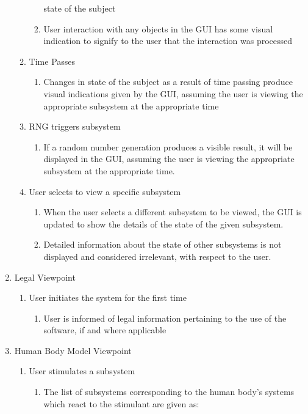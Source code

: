 \documentclass[]{article}
\begin{document}
\begin{enumerate}
\begin{enumerate}
\begin{enumerate}
			state of the subject
			\item User interaction with any objects in the GUI has some visual indication to signify to the user that the interaction was processed
		\end{enumerate}
		\item Time Passes
		\begin{enumerate}
		    \item Changes in state of the subject as a result of time passing produce visual indications given by the GUI, assuming the user is viewing the
		    appropriate subsystem at the appropriate time
		\end{enumerate}
		\item RNG triggers subsystem
		\begin{enumerate}
		    \item If a random number generation produces a visible result, it will be displayed in the GUI, assuming the user is viewing the
		    appropriate subsystem at the appropriate time.
		\end{enumerate}
		\item User selects to view a specific subsystem
		\begin{enumerate}
		    \item When the user selects a different subsystem to be viewed, the GUI is updated to show the details of the state of the given subsystem.
		    \item Detailed information about the state of other subsystems is not displayed and considered irrelevant, with respect to the user.
		\end{enumerate}
	\end{enumerate}
	\item Legal Viewpoint
	\begin{enumerate}
	    \item User initiates the system for the first time
	    \begin{enumerate}
	        \item User is informed of legal information pertaining to the use of the software, if and where applicable
	    \end{enumerate}
	\end{enumerate}
	\item Human Body Model Viewpoint
	\begin{enumerate}
	    \item User stimulates a subsystem
	    	\begin{enumerate}
        \item The list of subsystems corresponding to the human body's systems which react to the stimulant are given as:

\end{enumerate}
\end{enumerate}
\end{enumerate}
\end{document}
